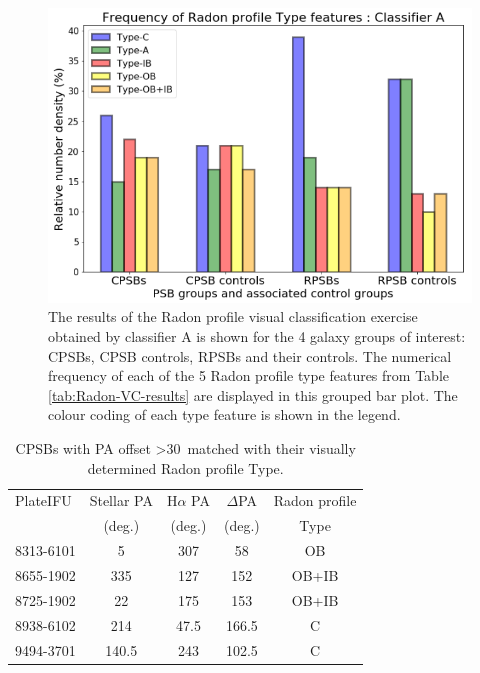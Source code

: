 \begin{figure}
    \centering
    \includegraphics[width=\columnwidth]{images/JupyterPlots/PROFILE-GROUPS-CLASSIFIER-A.png}
    \caption[Radon profile Type classifications determined by classifier A]{The results of the Radon profile visual classification exercise obtained by classifier A is shown for the 4 galaxy groups of interest: CPSBs, CPSB controls, RPSBs and their controls. The numerical frequency of each of the 5 Radon profile type features from Table \ref{tab:Radon-VC-results} are displayed in this grouped bar plot. The colour coding of each type feature is shown in the legend.}
    \label{fig:Radon-grouped-barchart}
\end{figure}

\begin{table}
\centering
\caption{CPSBs with PA offset \textgreater 30\textdegree\ matched with their visually determined Radon profile Type.}
\label{tab:offsetCPSBs-Radon-Type}
\begin{tabular}{lcccc}
\hline
PlateIFU  & Stellar PA & H$\alpha$ PA & $\Delta$PA & Radon profile\\
  & (deg.) & (deg.) & (deg.) & Type \\
\hline
8313-6101 & 5 & 307 & 58 & OB \\
8655-1902 & 335 & 127 & 152 & OB+IB \\
8725-1902 & 22 & 175 & 153 & OB+IB \\
8938-6102 & 214 & 47.5 & 166.5 & C \\
9494-3701 & 140.5 & 243 & 102.5 & C \\
\hline
\end{tabular}
\end{table}

